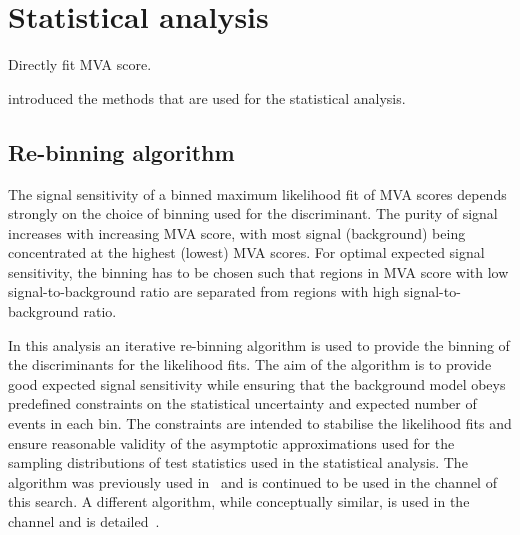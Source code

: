 \section{Statistical analysis}
\label{sec:statistical_analysis}


Directly fit MVA score.

 introduced the methods that are used
for the statistical analysis.



\subsection{Re-binning algorithm}
\label{sec:binning_alg}


The signal sensitivity of a binned maximum likelihood fit of
MVA scores depends strongly on the choice of binning used for the
discriminant. The purity of signal increases with increasing MVA
score, with most signal (background) being concentrated at the highest
(lowest) MVA scores. For optimal expected signal sensitivity, the
binning has to be chosen such that regions in MVA score with low
signal-to-background ratio are separated from regions with high
signal-to-background ratio.

In this analysis an iterative re-binning algorithm is used to provide
the binning of the discriminants for the likelihood fits. The aim of
the algorithm is to provide good expected signal sensitivity while
ensuring that the background model obeys predefined constraints on the
statistical uncertainty and expected number of events in each bin. The
constraints are intended to stabilise the likelihood fits and ensure
reasonable validity of the asymptotic approximations used for the
sampling distributions of test statistics used in the statistical
analysis. The algorithm was previously used
in~\cite{HIGG-2016-16-witherratum} and is continued to be used in the
\hadhad channel of this search. A different algorithm, while
conceptually similar, is used in the \lephad channel and is
detailed~\cite{ATLAS-CONF-2021-030}.

